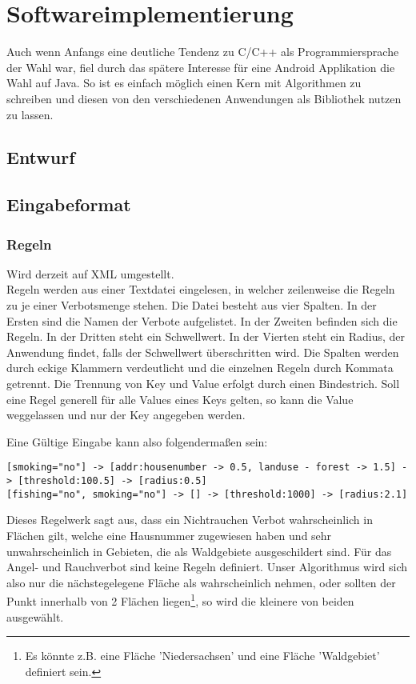 \section{Softwareimplementierung}
Auch wenn Anfangs eine deutliche Tendenz zu C/C++ als Programmiersprache der Wahl war, fiel durch das spätere Interesse für eine
Android Applikation die Wahl auf Java. So ist es einfach möglich einen Kern mit Algorithmen zu schreiben und diesen von den
verschiedenen Anwendungen als Bibliothek nutzen zu lassen.

\subsection{Entwurf}


\subsection{Eingabeformat}
\subsubsection{Regeln}
Wird derzeit auf XML umgestellt.\\
\label{sec:Eingabedaten_Wir}
Regeln werden aus einer Textdatei eingelesen, in welcher zeilenweise die Regeln zu je einer Verbotsmenge stehen.
Die Datei besteht aus vier Spalten. In der Ersten sind die Namen der Verbote aufgelistet. In der Zweiten befinden sich die Regeln.
In der Dritten steht ein Schwellwert. In der Vierten steht ein Radius, der Anwendung findet, falls der Schwellwert überschritten wird.
Die Spalten werden durch eckige Klammern verdeutlicht und die einzelnen Regeln durch Kommata getrennt.
Die Trennung von Key und Value erfolgt durch einen Bindestrich.
Soll eine Regel generell für alle Values eines Keys gelten, so kann die Value weggelassen und nur der Key angegeben werden.

Eine Gültige Eingabe kann also folgendermaßen sein:
\begin{lstlisting}[frame=single]
[smoking="no"] -> [addr:housenumber -> 0.5, landuse - forest -> 1.5] -> [threshold:100.5] -> [radius:0.5]
[fishing="no", smoking="no"] -> [] -> [threshold:1000] -> [radius:2.1]
\end{lstlisting}
Dieses Regelwerk sagt aus, dass ein Nichtrauchen Verbot wahrscheinlich in Flächen gilt, welche eine Hausnummer zugewiesen haben
und sehr unwahrscheinlich in Gebieten, die als Waldgebiete ausgeschildert sind. 
Für das Angel- und Rauchverbot sind keine Regeln definiert. Unser Algorithmus wird sich also nur die nächstegelegene Fläche als wahrscheinlich nehmen,
oder sollten der Punkt innerhalb von 2 Flächen liegen\footnote{Es könnte z.B. eine Fläche 'Niedersachsen' und eine Fläche 'Waldgebiet' definiert sein.},
so wird die kleinere von beiden ausgewählt.

